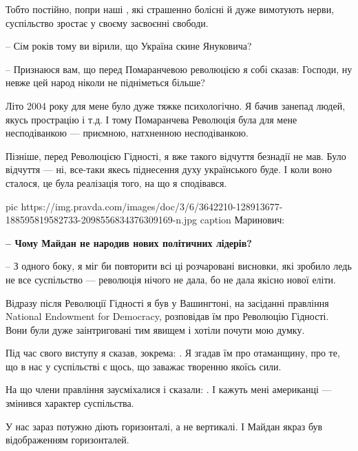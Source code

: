 Тобто постійно, попри наші , які страшенно болісні й дуже
вимотують нерви, суспільство зростає у своєму засвоєнні свободи.

– Сім років тому ви вірили, що Україна скине Януковича?

– Признаюся вам, що перед Помаранчевою революцією я собі сказав: Господи, ну
невже цей народ ніколи не підніметься більше?

Літо 2004 року для мене було дуже тяжке психологічно. Я бачив занепад людей,
якусь прострацію і т.д. І тому Помаранчева Революція була для мене
несподіванкою --- приємною, натхненною несподіванкою. 

Пізніше, перед Революцією Гідності, я вже такого відчуття безнадії не мав. Було
відчуття --- ні, все-таки якесь піднесення духу українського буде. І коли воно
сталося, це була реалізація того, на що я сподівався.

\ifcmt
pic https://img.pravda.com/images/doc/3/6/3642210-128913677-188595819582733-2098556834376309169-n.jpg
caption Маринович:  
\fi

{\bfseries 
– Чому Майдан не народив нових політичних лідерів?
}

– З одного боку, я міг би повторити всі ці розчаровані висновки, які зробило
ледь не все суспільство --- революція нічого не дала, бо не дала якісно нової
еліти. 

Відразу після Революції Гідності я був у Вашингтоні, на засіданні правління
National Endowment for Democracy, розповідав їм про Революцію Гідності. Вони
були дуже заінтриговані тим явищем і хотіли почути мою думку. 

Під час свого виступу я сказав, зокрема: . Я згадав їм про
отаманщину, про те, що в нас у суспільстві є щось, що заважає творенню якоїсь
сили. 

На що члени правління заусміхалися і сказали: . І кажуть мені
американці --- змінився характер суспільства.

У нас зараз потужно діють горизонталі, а не вертикалі. І Майдан якраз був
відображенням горизонталей. 

